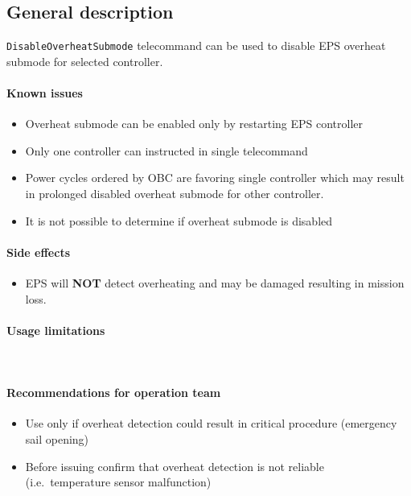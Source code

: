 

\subsection{General description}
\texttt{DisableOverheatSubmode} telecommand can be used to disable EPS overheat submode for selected controller.

\paragraph{Known issues} 
\begin{itemize}
	\item Overheat submode can be enabled only by restarting EPS controller
	\item Only one controller can instructed in single telecommand
	\item Power cycles ordered by OBC are favoring single controller which may result in prolonged disabled overheat submode for other controller.
	\item It is not possible to determine if overheat submode is disabled
\end{itemize}

\paragraph{Side effects} 
\begin{itemize}
	\item EPS will \textbf{NOT} detect overheating and may be damaged resulting in mission loss.
\end{itemize}

\paragraph{Usage limitations}\mbox{} \\
\None

\paragraph{Recommendations for operation team}
\begin{itemize}
	\item Use only if overheat detection could result in critical procedure (emergency sail opening)
	\item Before issuing confirm that overheat detection is not reliable (i.e.\ temperature sensor malfunction)
\end{itemize}

